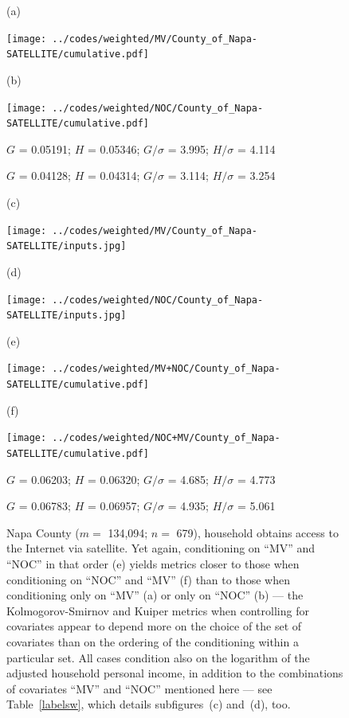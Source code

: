 \documentclass{article}
\newlength{\vertsep}
\newlength{\imsize}
\newlength{\imsized}
\begin{document}
\begin{figure}
\begin{centering}

(a) \parbox{\imsize}{\texttt{[image: ../codes/weighted/MV/County\_of\_Napa-SATELLITE/cumulative.pdf]}}
\quad\quad
(b) \parbox{\imsize}{\texttt{[image: ../codes/weighted/NOC/County\_of\_Napa-SATELLITE/cumulative.pdf]}}

\parbox{\imsized}{\hfil \footnotesize $G$ = 0.05191; $H$ = 0.05346;
$G/\sigma$ = 3.995; $H/\sigma$ = 4.114}
\parbox{\imsized}{\hfil \footnotesize $G$ = 0.04128; $H$ = 0.04314;
$G/\sigma$ = 3.114; $H/\sigma$ = 3.254}

\vspace{\vertsep}

(c) \parbox{\imsize}{\texttt{[image: ../codes/weighted/MV/County\_of\_Napa-SATELLITE/inputs.jpg]}}
\quad\quad
(d) \parbox{\imsize}{\texttt{[image: ../codes/weighted/NOC/County\_of\_Napa-SATELLITE/inputs.jpg]}}

\vspace{\vertsep}

(e) \parbox{\imsize}{\texttt{[image: ../codes/weighted/MV+NOC/County\_of\_Napa-SATELLITE/cumulative.pdf]}}
\quad\quad
(f) \parbox{\imsize}{\texttt{[image: ../codes/weighted/NOC+MV/County\_of\_Napa-SATELLITE/cumulative.pdf]}}

\parbox{\imsized}{\hfil \footnotesize $G$ = 0.06203; $H$ = 0.06320;
$G/\sigma$ = 4.685; $H/\sigma$ = 4.773}
\parbox{\imsized}{\hfil \footnotesize $G$ = 0.06783; $H$ = 0.06957;
$G/\sigma$ = 4.935; $H/\sigma$ = 5.061}

\end{centering}
\caption{Napa County ($m =$ 134,094; $n =$ 679),
household obtains access to the Internet via satellite.
Yet again, conditioning on ``MV'' and ``NOC'' in that order (e) yields
metrics closer to those when conditioning on ``NOC'' and ``MV'' (f)
than to those when conditioning only on ``MV'' (a) or only on ``NOC'' (b) ---
the Kolmogorov-Smirnov and Kuiper metrics when controlling
for covariates appear to depend more on the choice
of the set of covariates than on the ordering of the conditioning
within a particular set. All cases condition also on the logarithm
of the adjusted household personal income, in addition to the combinations
of covariates ``MV'' and ``NOC'' mentioned here --- see Table~\ref{labelsw},
which details subfigures~(c) and~(d), too.}
\label{napa}
\end{figure}


\clearpage
\end{document}
